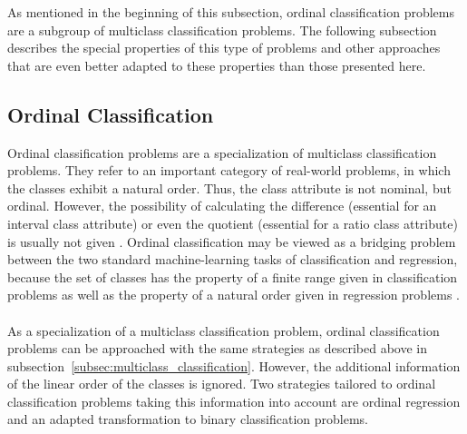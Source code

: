 \documentclass[article,type=msc,colorback,accentcolor=tud7b]{tudthesis}
\begin{document}
    As mentioned in the beginning of this subsection, ordinal classification problems are a subgroup of multiclass classification problems. The following subsection describes the special properties of this type of problems and other approaches that are even better adapted to these properties than those presented here.

  \subsection{Ordinal Classification}
  \label{subsec:ordinal_classification}
    Ordinal classification problems are a specialization of multiclass classification problems. They refer to an important category of real-world problems, in which the classes exhibit a natural order. Thus, the class attribute is not nominal, but ordinal. However, the possibility of calculating the difference (essential for an interval class attribute) or even the quotient (essential for a ratio class attribute) is usually not given \autocite[Section~1]{Frank2001}. Ordinal classification may be viewed as a bridging problem between the two standard machine-learning tasks of classification and regression, because the set of classes has the property of a finite range given in classification problems as well as the property of a natural order given in regression problems \autocite[Section~1]{Kotsiantis2004}. \\\\
    As a specialization of a multiclass classification problem, ordinal classification problems can be approached with the same strategies as described above in subsection~\ref{subsec:multiclass_classification}. However, the additional information of the linear order of the classes is ignored. Two strategies tailored to ordinal classification problems taking this information into account are ordinal regression and an adapted transformation to binary classification problems.
\end{document}
